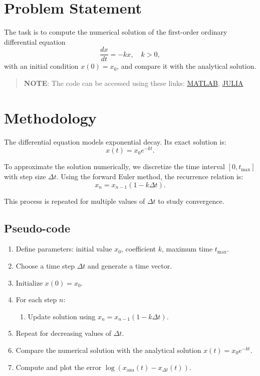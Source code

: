 \section*{Problem Statement}
The task is to compute the numerical solution of the first-order ordinary differential equation
\[
    \frac{dx}{dt} = -kx, \quad k > 0,
\]
with an initial condition $x(0) = x_0$, and compare it with the analytical solution.

\begin{quote}
  \textbf{NOTE}: The code can be accessed using these links: \href{https://raw.githubusercontent.com/HavokSahil/computational-techniques-assignments/refs/heads/main/assignment0/a1_1d_diff_eq.m}{MATLAB}, \href{https://raw.githubusercontent.com/HavokSahil/computational-techniques-assignments/refs/heads/main/assignment0/a1_1d_diff_eq.jl}{JULIA}
\end{quote}

\section*{Methodology}
The differential equation models exponential decay. Its exact solution is:
\[
    x(t) = x_0 e^{-kt}.
\]

To approximate the solution numerically, we discretize the time interval $[0, t_{\max}]$ with step size $\Delta t$. Using the forward Euler method, the recurrence relation is:
\[
    x_{n} = x_{n-1} (1 - k \Delta t).
\]

This process is repeated for multiple values of $\Delta t$ to study convergence.

\subsection*{Pseudo-code}
\begin{enumerate}
    \item Define parameters: initial value $x_0$, coefficient $k$, maximum time $t_{\max}$.
    \item Choose a time step $\Delta t$ and generate a time vector.
    \item Initialize $x(0) = x_0$.
    \item For each step $n$:
    \begin{enumerate}
        \item Update solution using $x_{n} = x_{n-1}(1 - k \Delta t)$.
    \end{enumerate}
    \item Repeat for decreasing values of $\Delta t$.
    \item Compare the numerical solution with the analytical solution $x(t) = x_0 e^{-kt}$.
    \item Compute and plot the error $\log(x_{\text{ana}}(t) - x_{\Delta t}(t))$.
\end{enumerate}

